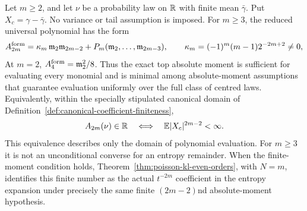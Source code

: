 \begin{proposition}%
\label{thm:sharp-moment-equivalence-hierarchy}
Let \(m\ge2\), and let \(\nu\) be a probability law on \(\mathbb{R}\) with finite
mean \(\bar\gamma\).  Put \(X_c=\gamma-\bar\gamma\).  No variance or tail
assumption is imposed.  For \(m\ge3\), the reduced universal polynomial has
the form
\begin{equation}\label{eq:sharp-moment-equivalence-top-layer}
A_{2m}^{\rm form}
=\kappa_m\,\mathfrak m_2\mathfrak m_{2m-2}
 +P_m(\mathfrak m_2,\ldots,\mathfrak m_{2m-3}),
\qquad
\kappa_m=(-1)^m(m-1)2^{-2m+2}\ne0,
\end{equation}
At \(m=2\), \(A_4^{\rm form}=\mathfrak m_2^2/8\).  Thus the exact top absolute moment
is sufficient for evaluating every monomial and is minimal among
absolute-moment assumptions that guarantee evaluation uniformly over the full
class of centred laws.  Equivalently, within the specially stipulated
canonical domain of Definition~\ref{def:canonical-coefficient-finiteness},
\begin{equation}\label{eq:sharp-moment-equivalence-hierarchy}
 A_{2m}(\nu)\in\mathbb{R}
 \quad\Longleftrightarrow\quad
 \mathbb{E}|X_c|^{2m-2}<\infty .
\end{equation}
This equivalence describes only the domain of polynomial evaluation.  For
\(m\ge3\) it is not an unconditional converse for an entropy remainder.  When the
finite-moment condition holds, Theorem~\ref{thm:poisson-kl-even-orders}, with
\(N=m\), identifies this finite number as the actual \(t^{-2m}\)
coefficient in the entropy expansion under precisely the same finite
\((2m-2)\)nd absolute-moment hypothesis.
\end{proposition}

